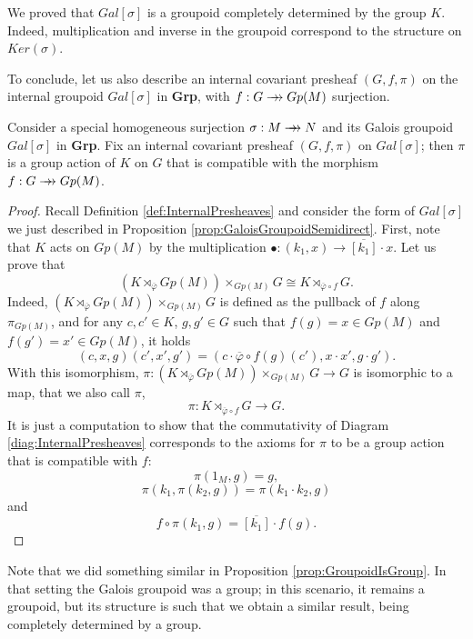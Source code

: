 \begin{oss*}
    We proved that $Gal[\sigma]$ is a groupoid completely determined by the group $K$. Indeed, multiplication and inverse in the groupoid correspond to the structure on $Ker(\sigma)$.
\end{oss*}

To conclude, let us also describe an internal covariant presheaf $(G,f,\pi)$ on the internal groupoid $Gal[\sigma]$ in \textbf{Grp}, with $f:G\rrightarrow Gp(M)$ surjection.
\begin{proposition}
\label{prop:InternalCovariantSemidirect}
    Consider a special homogeneous surjection $\sigma:M\rrightarrow N$ and its Galois groupoid $Gal[\sigma]$ in \textbf{Grp}. Fix an internal covariant presheaf $(G,f,\pi)$ on $Gal[\sigma]$; then $\pi$ is a group action of $K$ on $G$ that is compatible with the morphism $f:G\rrightarrow Gp(M)$.
    \begin{proof}
        Recall Definition \ref{def:InternalPresheaves} and consider the form of $Gal[\sigma]$ we just described in Proposition \ref{prop:GaloisGroupoidSemidirect}. First, note that $K$ acts on $Gp(M)$ by the multiplication $\bullet:(k_1,x)\to \overline{[k_1]}\cdot x$. Let us prove that
        \[ (K\rtimes_{\overline{\varphi}} Gp(M))\times_{Gp(M)}G \cong K\rtimes_{\overline{\varphi}\circ f}G. \]
        Indeed, $(K\rtimes_{\overline{\varphi}} Gp(M))\times_{Gp(M)}G$ is defined as the pullback of $f$ along $\pi_{Gp(M)}$, and for any $c,c'\in K$, $g,g'\in G$ such that $f(g)=x\in Gp(M)$ and $f(g')=x'\in Gp(M)$, it holds
        \[ (c,x,g)(c',x',g') = (c\cdot \overline{\varphi}\circ f(g)(c'), x\cdot x',g\cdot g'). \]
        With this isomorphism, $\pi:(K\rtimes_{\overline{\varphi}} Gp(M))\times_{Gp(M)}G\to G$ is isomorphic to a map, that we also call $\pi$,
        \[ \pi:K\rtimes_{\overline{\varphi}\circ f}G \longrightarrow G. \]
        It is just a computation to show that the commutativity of Diagram \ref{diag:InternalPresheaves} corresponds to the axioms for $\pi$ to be a group action that is compatible with $f$:
        \[ \pi(1_M,g) = g, \]
        \[ \pi(k_1,\pi(k_2,g)) = \pi(k_1\cdot k_2, g) \]
        and
        \[ f\circ \pi(k_1,g) = \overline{[k_1]}\cdot f(g). \]
    \end{proof}
\end{proposition}
\begin{oss*}
    Note that we did something similar in Proposition \ref{prop:GroupoidIsGroup}. In that setting the Galois groupoid was a group; in this scenario, it remains a groupoid, but its structure is such that we obtain a similar result, being completely determined by a group.
\end{oss*}

